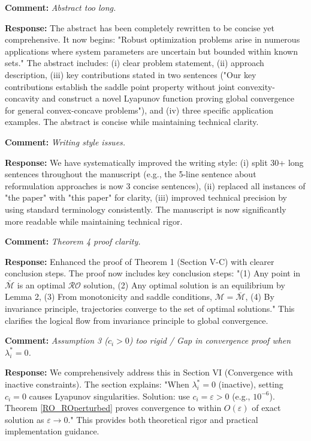 \documentclass[journal,twoside,web]{ieeecolor}
\begin{document}
\textbf{Comment:} \textit{Abstract too long.}

\textbf{Response:} The abstract has been completely rewritten to be concise yet comprehensive. It now begins: "Robust optimization problems arise in numerous applications where system parameters are uncertain but bounded within known sets." The abstract includes: (i) clear problem statement, (ii) approach description, (iii) key contributions stated in two sentences ("Our key contributions establish the saddle point property without joint convexity-concavity and construct a novel Lyapunov function proving global convergence for general convex-concave problems"), and (iv) three specific application examples. The abstract is concise while maintaining technical clarity.

\textbf{Comment:} \textit{Writing style issues.}

\textbf{Response:} We have systematically improved the writing style: (i) split 30+ long sentences throughout the manuscript (e.g., the 5-line sentence about reformulation approaches is now 3 concise sentences), (ii) replaced all instances of "the paper" with "this paper" for clarity, (iii) improved technical precision by using standard terminology consistently. The manuscript is now significantly more readable while maintaining technical rigor.

\textbf{Comment:} \textit{Theorem 4 proof clarity.}

\textbf{Response:} Enhanced the proof of Theorem 1 (Section V-C) with clearer conclusion steps. The proof now includes key conclusion steps: "(1) Any point in $\bar{\mathcal{M}}$ is an optimal $\mathcal{RO}$ solution, (2) Any optimal solution is an equilibrium by Lemma 2, (3) From monotonicity and saddle conditions, $\mathcal{M} = \bar{\mathcal{M}}$, (4) By invariance principle, trajectories converge to the set of optimal solutions." This clarifies the logical flow from invariance principle to global convergence.

\textbf{Comment:} \textit{Assumption 3 ($c_i > 0$) too rigid / Gap in convergence proof when $\lambda_i^* = 0$.}

\textbf{Response:} We comprehensively address this in Section VI (Convergence with inactive constraints). The section explains: "When $\lambda_i^* = 0$ (inactive), setting $c_i = 0$ causes Lyapunov singularities. Solution: use $c_i = \varepsilon > 0$ (e.g., $10^{-6}$). Theorem \ref{RO_ROperturbed} proves convergence to within $O(\varepsilon)$ of exact solution as $\varepsilon \to 0$." This provides both theoretical rigor and practical implementation guidance.
\end{document}
